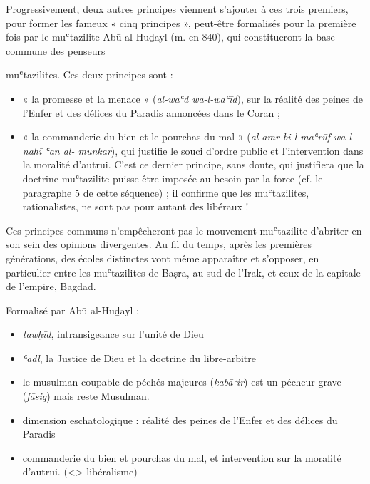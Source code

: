 Progressivement, deux autres principes viennent s'ajouter à ces trois
premiers, pour
former les fameux « cinq principes », peut-être formalisés pour la
première fois par le
muʿtazilite Abū al-Huḏayl (m. en 840), qui constitueront la base commune
des penseurs

muʿtazilites. Ces deux principes sont :

\begin{itemize}
\item

  « la promesse et la menace » (\emph{al-waʿd wa-l-waʿīd}), sur la
  réalité des peines de l'Enfer et des
délices du Paradis annoncées dans le Coran ;


\item
 
  « la commanderie du bien et le pourchas du mal » (\emph{al-amr
  bi-l-maʿrūf wa-l-nahī ʿan al- munkar}), qui justifie le souci d'ordre
  public et l'intervention dans la moralité d'autrui. C'est ce dernier
  principe, sans doute, qui justifiera que la doctrine muʿtazilite
  puisse être imposée au besoin par la force (cf. le paragraphe 5 de
  cette séquence) ; il confirme que les muʿtazilites, rationalistes, ne
  sont pas pour autant des libéraux !

\end{itemize}

Ces principes communs n'empêcheront pas le mouvement muʿtazilite
d'abriter en son sein des opinions divergentes. Au fil du temps, après
les premières générations, des écoles distinctes vont même apparaître et
s'opposer, en particulier entre les muʿtazilites de Baṣra, au sud de
l'Irak, et ceux de la capitale de l'empire, Bagdad.

\begin{Def}
Formalisé par Abū al-Huḏayl :
\begin{itemize}
    \item \emph{tawḥīd}, intransigeance sur l'unité de Dieu
    \item \emph{ʿadl}, la {Justice de Dieu} et la doctrine du libre-arbitre
    \item le musulman coupable de péchés majeures (\emph{kabāʾir}) est un pécheur grave (\emph{fāsiq}) mais reste Musulman.
    \item dimension eschatologique : réalité des peines de l'Enfer et des délices du Paradis
    \item commanderie du bien et pourchas du mal, et intervention sur la moralité d'autrui. (<> libéralisme)
\end{itemize}

\end{Def}

